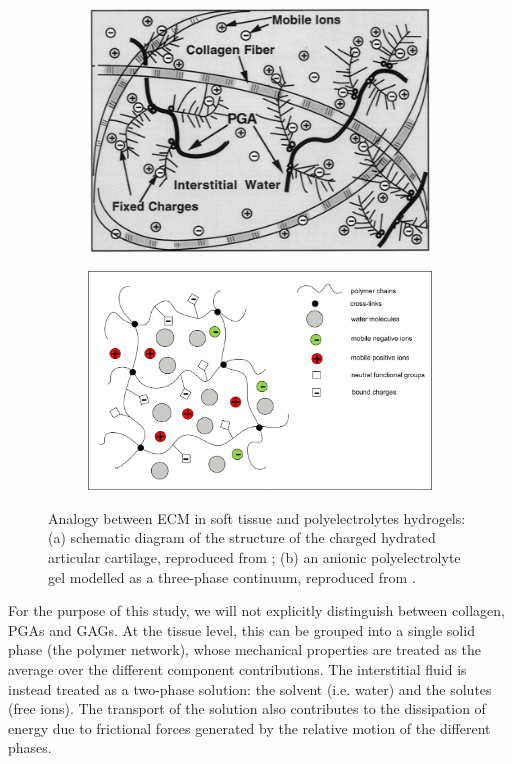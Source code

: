 \documentclass[runningheads]{llncs}
\begin{document}
\begin{figure}[h]
	\begin{subfigure}{0.49\textwidth}
		\centering
		\includegraphics[scale=0.38]{images/ECM}
		\caption{}
		\label{ECMfig_a}
	\end{subfigure}
	\begin{subfigure}{0.49\textwidth}
		\centering
		\includegraphics[scale=0.42]{images/ecmscheme.jpg}
		\caption{}
	\end{subfigure}
	\caption{Analogy between ECM in soft tissue and polyelectrolytes hydrogels: (a) schematic diagram of the structure of the charged hydrated articular cartilage, reproduced from \cite{pictureECM}; (b) an anionic polyelectrolyte gel modelled as a three-phase continuum, reproduced from \cite{DROZDOVph}.}
	\label{ECMfig}
\end{figure}

For the purpose of this study, we will not explicitly distinguish between collagen, PGAs and GAGs. At the tissue level, this can be grouped into a single solid phase (the polymer network), whose mechanical properties are treated as the average over the different component contributions. The interstitial fluid is instead treated as a two-phase solution: the solvent (i.e. water) and the solutes (free ions). The transport of the solution also contributes to the dissipation of energy due to frictional forces generated by the relative motion of the different phases.
\end{document}
